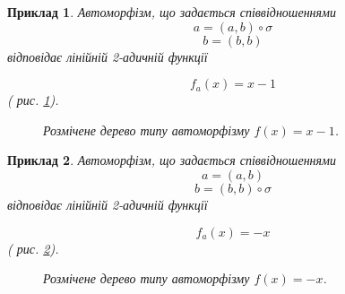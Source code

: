 \documentclass[a4paper,12pt]{article} \usepackage{a4wide}
\numberwithin{equation}{subsection}
\newtheorem{example}{Приклад}[subsection]
\begin{document}
\begin{example}
Автоморфізм, що задається співвідношеннями
$$a = (a,b)\circ \sigma$$
$$b = (b,b)$$
відповідає лінійній 2-адичній функції

$$f_a(x) = x-1 $$
( рис. \ref{marked_type_tree_xm1}).
\begin{figure}[h!]
\caption{Розмічене дерево типу автоморфізму $f(x)=x-1$.}
\label{marked_type_tree_xm1}
\end{figure}


\end{example}

\begin{example}
Автоморфізм, що задається співвідношеннями
$$a = (a,b)$$
$$b = (b,b)\circ \sigma$$
відповідає лінійній 2-адичній функції

$$f_a(x) = -x $$
( рис. \ref{marked_type_tree_mx}).
\begin{figure}[h!]
\caption{Розмічене дерево типу автоморфізму $f(x)=-x$.}
\label{marked_type_tree_mx}
\end{figure}


\end{example}
\end{document}
